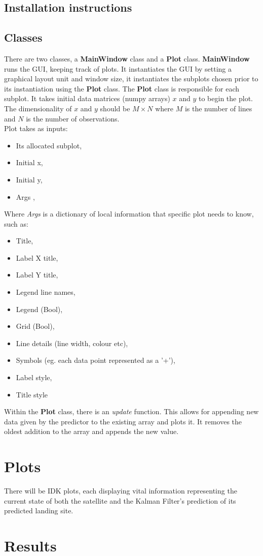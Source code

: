 \documentclass[12pt, a4paper]{article}
\begin{document}
\subsection{Installation instructions}
\subsection{Classes}
There are two classes, a \textbf{MainWindow} class and a \textbf{Plot} class. \textbf{MainWindow} runs the GUI, keeping track of plots. It instantiates the GUI by setting a graphical layout unit and window size, it instantiates the subplots chosen prior to its instantiation using the \textbf{Plot} class. The \textbf{Plot} class is responsible for each subplot. It takes initial data matrices (numpy arrays) $x$ and $y$ to begin the plot. The dimensionality of $x$ and $y$ should be $M\times N$ where $M$ is the number of lines and $N$ is the number of observations. \\ 
Plot takes as inputs: 
\begin{itemize}
\item Its allocated subplot,
\item Initial x,
\item Initial y,
\item Args ,
\end{itemize}
Where \textit{Args} is a dictionary of local information that specific plot needs to know, such as:
\begin{itemize}
\item Title,
\item Label X title,
\item Label Y title,
\item Legend line names,
\item Legend (Bool),
\item Grid (Bool),
\item Line details (line width, colour etc),
\item Symbols (eg. each data point represented as a '+'),
\item Label style,
\item Title style
\end{itemize}

Within the \textbf{Plot} class, there is an \textit{update} function. This allows for appending new data given by the predictor to the existing array and plots it. It removes the oldest addition to the array and appends the new value. 
\section{Plots}
There will be IDK plots, each displaying vital information representing the current state of both the satellite and the Kalman Filter's prediction of its predicted landing site. 

\section{Results}
\end{document}
